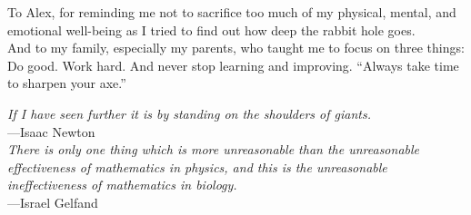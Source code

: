 %
\begin{frontmatter}

%
%
\makefrontmatter

%
%
%
%
%
%
\begin{dedication}
  To Alex, for reminding me not to sacrifice too much of my physical, mental, and emotional well-being as I tried to find out how deep the rabbit hole goes.
  \\And to my family, especially my parents, who taught me to focus on three things:
  \\Do good. Work hard. And never stop learning and improving.
  \newline \newline \newline
  ``Always take time to sharpen your axe.''
\end{dedication}


%
%



%
%
\begin{epigraph} %
  \emph{If I have seen further it is by standing on the shoulders of giants.}\\
  ---Isaac Newton\\
  \vspace{1in}
  \emph{There is only one thing which is more unreasonable than the unreasonable effectiveness of mathematics in physics, and this is the unreasonable ineffectiveness of mathematics in biology.}\\
  ---Israel Gelfand
\end{epigraph}


\end{frontmatter}
